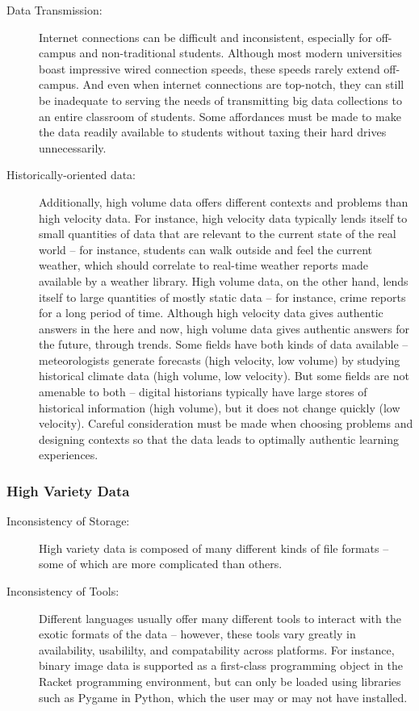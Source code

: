 \begin{description}
	\item[Data Transmission:] Internet connections can be difficult and inconsistent, especially for off-campus
and non-traditional students. Although most modern universities boast impressive wired connection
speeds, these speeds rarely extend off-campus. And even when internet connections are top-notch,
they can still be inadequate to serving the needs of transmitting big data collections to an entire
classroom of students. Some affordances must be made to make the data readily available to students without taxing their hard drives unnecessarily.
	\item[Historically-oriented data:] Additionally, high volume data offers different contexts and problems than high velocity data.
For instance, high velocity data typically lends itself to small quantities of data that are relevant to the current state of the real world -- for instance, students can walk outside and feel the current weather, which should correlate to real-time weather reports made available by a weather library.
High volume data, on the other hand, lends itself to large quantities of mostly static data -- for instance, crime reports for a long period of time.
Although high velocity data gives authentic answers in the here and now, high volume data gives authentic answers for the future, through trends.
Some fields have both kinds of data available -- meteorologists generate forecasts (high velocity, low volume) by studying historical climate data (high volume, low velocity).
But some fields are not amenable to both -- digital historians typically have large stores of historical information (high volume), but it does not change quickly (low velocity).
Careful consideration must be made when choosing problems and designing contexts so that the data leads to optimally authentic learning experiences.
\end{description}


\subsubsection{High Variety Data}

\begin{description}
\item[Inconsistency of Storage:] High variety data is composed of many different kinds of file formats -- some of which are more complicated than others.
\item[Inconsistency of Tools:] Different languages usually offer many different tools to interact with the exotic formats of the data -- however, these tools vary greatly in availability, usabililty, and compatability across platforms. For instance, binary image data is supported as a first-class programming object in the Racket programming environment, but can only be loaded using libraries such as Pygame in Python, which the user may or may not have installed.
\end{description}
